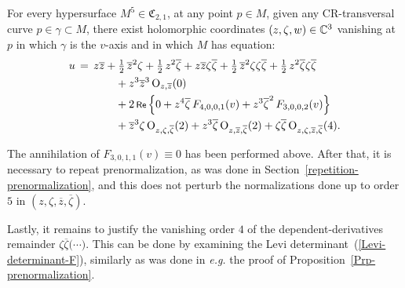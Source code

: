 \documentclass[12pt,twoside,leqno,openany]{amsart}
\begin{document}
\begin{Proposition}
\label{Prp-normalization-order-5-v-axis}
For every hypersurface $M^5 \in \mathfrak{C}_{2,1}$, 
at any point $p \in M$, 
given any CR-transversal curve $p \in \gamma \subset M$,
there exist holomorphic coordinates $(z, \zeta, w) \in \mathbb{C}^3$
vanishing at $p$ in which $\gamma$ is the $v$-axis and in which
$M$ has equation:
\[
\aligned
u
&
\,=\,
z\overline{z}
+
\tfrac{1}{2}\,\overline{z}^2\zeta
+
\tfrac{1}{2}\,z^2\overline{\zeta}
+
z\overline{z}\zeta\overline{\zeta}
+
\tfrac{1}{2}\,\overline{z}^2\zeta\zeta\overline{\zeta}
+
\tfrac{1}{2}\,z^2\overline{\zeta}\zeta\overline{\zeta}
\\
&
\ \ \ \ \ \ \ \ \ \ \ 
+
z^3\overline{z}^3\,
{\rm O}_{z,\overline{z}}(0)
\\
&
\ \ \ \ \ \ \ \ \ \ \ 
+
2\,\Re\,
\Big\{
0
+
z^4\overline{\zeta}\,
F_{4,0,0,1}(v)
+
z^3\overline{\zeta}^2\,
F_{3,0,0,2}(v)
\Big\}
\\
&
\ \ \ \ \ \ \ \ \ \ \ 
+
\overline{z}^3\zeta\,
{\rm O}_{z,\zeta,\overline{\zeta}}(2)
+
z^3\overline{\zeta}\,
{\rm O}_{z,\overline{z},\overline{\zeta}}(2)
+
\zeta\overline{\zeta}\,
{\rm O}_{z,\zeta,\overline{z},\overline{\zeta}}(4).
\endaligned
\]
\end{Proposition}

\proof
The annihilation of $F_{3,0,1,1}(v) \equiv 0$ has been 
performed
above. After that, it is necessary to
repeat prenormalization, as was done in
Section~{\ref{repetition-prenormalization}}, and this
does not perturb the normalizations done
up to order $5$ in $(z, \zeta, \overline{z}, \overline{\zeta})$.

Lastly, 
it remains to justify the vanishing order $4$
of the dependent-derivatives remainder
$\zeta \overline{\zeta} \big( \cdots \big)$.
This can be done by examining the Levi 
determinant~({\ref{Levi-determinant-F}}),
similarly as was done in {\em e.g.} the proof
of Proposition~{\ref{Prp-prenormalization}}.
\endproof

\label{normalizations-origin}
\end{document}

